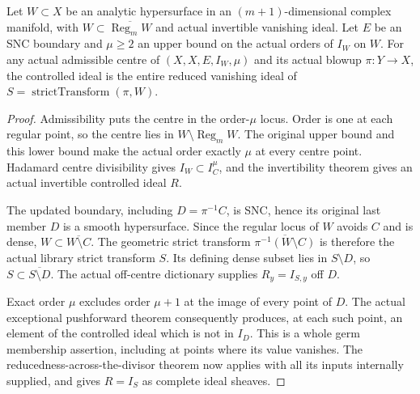 \begin{theorem}
\label{hir:actual-max-order-hypersurface-strict-ideal}
\leanok
Let $W\subset X$ be an analytic hypersurface in an $(m+1)$-dimensional
complex manifold, with $W\subset\overline{\operatorname{Reg}_mW}$ and
actual invertible vanishing ideal.  Let $E$ be an SNC boundary and
$\mu\ge2$ an upper bound on the actual orders of $I_W$ on $W$.
For any actual admissible centre of $(X,X,E,I_W,\mu)$ and its actual
blowup $\pi:Y\to X$, the controlled ideal is the entire reduced
vanishing ideal of $S=\operatorname{strictTransform}(\pi,W)$.
\end{theorem}
\begin{proof}
Admissibility puts the centre in the order-$\mu$ locus.  Order is one
at each regular point, so the centre lies in $W\setminus\operatorname{Reg}_mW$.
The original upper bound and this lower bound make the actual order
exactly $\mu$ at every centre point.  Hadamard centre divisibility
gives $I_W\subset I_C^\mu$, and the invertibility theorem gives an
actual invertible controlled ideal $R$.

The updated boundary, including $D=\pi^{-1}C$, is SNC, hence its
original last member $D$ is a smooth hypersurface.  Since the regular
locus of $W$ avoids $C$ and is dense, $W\subset\overline{W\setminus C}$.
The geometric strict transform $\overline{\pi^{-1}(W\setminus C)}$
is therefore the actual library strict transform $S$.  Its defining
dense subset lies in $S\setminus D$, so $S\subset\overline{S\setminus D}$.
The actual off-centre dictionary supplies $R_y=I_{S,y}$ off $D$.

Exact order $\mu$ excludes order $\mu+1$ at the image of every point
of $D$.  The actual exceptional pushforward theorem consequently
produces, at each such point, an element of the controlled ideal which
is not in $I_D$.  This is a whole germ membership assertion, including
at points where its value vanishes.  The reducedness-across-the-divisor
theorem now applies with all its inputs internally supplied, and gives
$R=I_S$ as complete ideal sheaves.
\end{proof}

